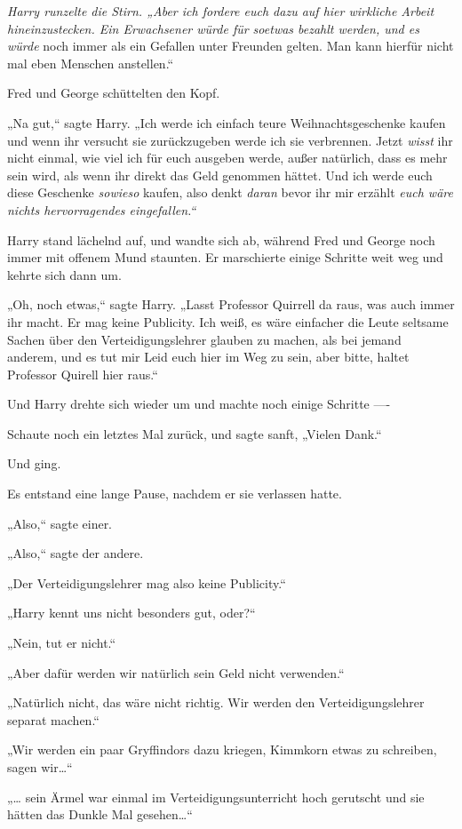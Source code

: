 {\emph{Harry runzelte die Stirn. „Aber ich fordere euch dazu auf hier wirkliche Arbeit hineinzustecken. Ein Erwachsener würde für soetwas bezahlt werden, und es würde} noch immer als ein Gefallen unter Freunden gelten. Man kann hierfür nicht mal eben Menschen anstellen.“

Fred und George schüttelten den Kopf.

„Na gut,“ sagte Harry. „Ich werde ich einfach teure Weihnachtsgeschenke kaufen und wenn ihr versucht sie zurückzugeben werde ich sie verbrennen. Jetzt \emph{wisst} ihr nicht einmal, wie viel ich für euch ausgeben werde, außer natürlich, dass es mehr sein wird, als wenn ihr direkt das Geld genommen hättet. Und ich werde euch diese Geschenke \emph{sowieso} kaufen, also denkt \emph{daran} bevor ihr mir erzählt \emph{euch wäre nichts hervorragendes eingefallen.“}

Harry stand lächelnd auf, und wandte sich ab, während Fred und George noch immer mit offenem Mund staunten. Er marschierte einige Schritte weit weg und kehrte sich dann um.

„Oh, noch etwas,“ sagte Harry. „Lasst Professor Quirrell da raus, was auch immer ihr macht. Er mag keine Publicity. Ich weiß, es wäre einfacher die Leute seltsame Sachen über den Verteidigungslehrer glauben zu machen, als bei jemand anderem, und es tut mir Leid euch hier im Weg zu sein, aber bitte, haltet Professor Quirell hier raus.“

Und Harry drehte sich wieder um und machte noch einige Schritte ----

Schaute noch ein letztes Mal zurück, und sagte sanft, „Vielen Dank.“

Und ging.

Es entstand eine lange Pause, nachdem er sie verlassen hatte.

„Also,“ sagte einer.

„Also,“ sagte der andere.

„Der Verteidigungslehrer mag also keine Publicity.“

„Harry kennt uns nicht besonders gut, oder?“

„Nein, tut er nicht.“

„Aber dafür werden wir natürlich sein Geld nicht verwenden.“

„Natürlich nicht, das wäre nicht richtig. Wir werden den Verteidigungslehrer separat machen.“

„Wir werden ein paar Gryffindors dazu kriegen, Kimmkorn etwas zu schreiben, sagen wir…“

„… sein Ärmel war einmal im Verteidigungsunterricht hoch gerutscht und sie hätten das Dunkle Mal gesehen…“

}
